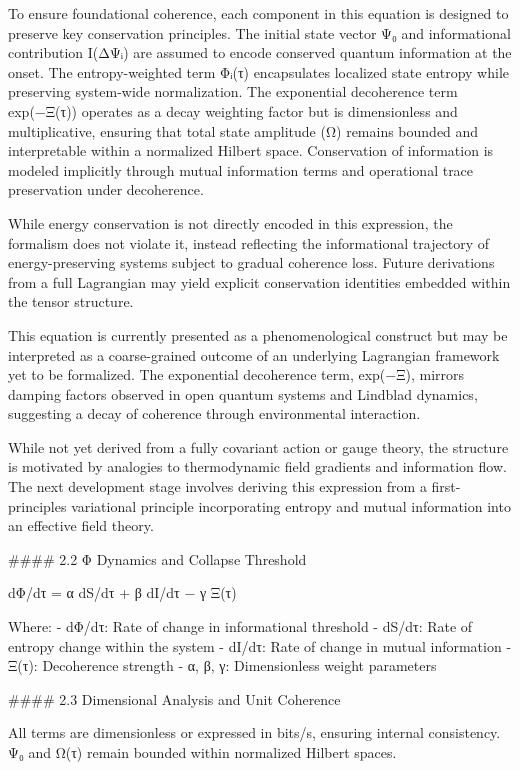 To ensure foundational coherence, each component in this equation is designed to preserve key conservation principles. The initial state vector Ψ₀ and informational contribution I(ΔΨᵢ) are assumed to encode conserved quantum information at the onset. The entropy-weighted term Φᵢ(τ) encapsulates localized state entropy while preserving system-wide normalization. The exponential decoherence term exp(−Ξ(τ)) operates as a decay weighting factor but is dimensionless and multiplicative, ensuring that total state amplitude (Ω) remains bounded and interpretable within a normalized Hilbert space. Conservation of information is modeled implicitly through mutual information terms and operational trace preservation under decoherence.

While energy conservation is not directly encoded in this expression, the formalism does not violate it, instead reflecting the informational trajectory of energy-preserving systems subject to gradual coherence loss. Future derivations from a full Lagrangian may yield explicit conservation identities embedded within the tensor structure.

This equation is currently presented as a phenomenological construct but may be interpreted as a coarse-grained outcome of an underlying Lagrangian framework yet to be formalized. The exponential decoherence term, exp(−Ξ), mirrors damping factors observed in open quantum systems and Lindblad dynamics, suggesting a decay of coherence through environmental interaction.

While not yet derived from a fully covariant action or gauge theory, the structure is motivated by analogies to thermodynamic field gradients and information flow. The next development stage involves deriving this expression from a first-principles variational principle incorporating entropy and mutual information into an effective field theory.

#### 2.2 Φ Dynamics and Collapse Threshold

dΦ/dτ = α dS/dτ + β dI/dτ − γ Ξ(τ)

Where:
- dΦ/dτ: Rate of change in informational threshold
- dS/dτ: Rate of entropy change within the system
- dI/dτ: Rate of change in mutual information
- Ξ(τ): Decoherence strength
- α, β, γ: Dimensionless weight parameters

#### 2.3 Dimensional Analysis and Unit Coherence

All terms are dimensionless or expressed in bits/s, ensuring internal consistency. Ψ₀ and Ω(τ) remain bounded within normalized Hilbert spaces.

